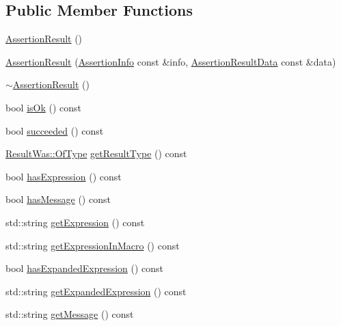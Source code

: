 \subsection*{Public Member Functions}
\begin{DoxyCompactItemize}
\item 
\hyperlink{class_catch_1_1_assertion_result_a570b999c5f66e33cb31d3adb29fec25b}{Assertion\-Result} ()
\item 
\hyperlink{class_catch_1_1_assertion_result_ab58aeec27052ba400633ed0e36cea692}{Assertion\-Result} (\hyperlink{struct_catch_1_1_assertion_info}{Assertion\-Info} const \&info, \hyperlink{struct_catch_1_1_assertion_result_data}{Assertion\-Result\-Data} const \&data)
\item 
\hyperlink{class_catch_1_1_assertion_result_abf90f5abd04d38b2fb4f5d575bdc4f1e}{$\sim$\-Assertion\-Result} ()
\item 
bool \hyperlink{class_catch_1_1_assertion_result_a70fb6aa62a38db3bdcafb4bb134afb21}{is\-Ok} () const 
\item 
bool \hyperlink{class_catch_1_1_assertion_result_a5404062147930354afeb154de7cbaa7e}{succeeded} () const 
\item 
\hyperlink{struct_catch_1_1_result_was_a624e1ee3661fcf6094ceef1f654601ef}{Result\-Was\-::\-Of\-Type} \hyperlink{class_catch_1_1_assertion_result_aa90bec8064879a62fcdc8e1079bcdba1}{get\-Result\-Type} () const 
\item 
bool \hyperlink{class_catch_1_1_assertion_result_a45551f4f092c640ffce0cdd8a94f4b62}{has\-Expression} () const 
\item 
bool \hyperlink{class_catch_1_1_assertion_result_ab22a1c9baa182aeb2549fffeb8294d9e}{has\-Message} () const 
\item 
std\-::string \hyperlink{class_catch_1_1_assertion_result_a6105300b90d66b5c11b69813f83d074d}{get\-Expression} () const 
\item 
std\-::string \hyperlink{class_catch_1_1_assertion_result_ac368a7490af7669decd58efea7d7dc54}{get\-Expression\-In\-Macro} () const 
\item 
bool \hyperlink{class_catch_1_1_assertion_result_a122c369bd49430a304e3eaebdf184f36}{has\-Expanded\-Expression} () const 
\item 
std\-::string \hyperlink{class_catch_1_1_assertion_result_a675d074588875eb62b0b6e36e05d65e6}{get\-Expanded\-Expression} () const 
\item 
std\-::string \hyperlink{class_catch_1_1_assertion_result_a9793bfc4d24678c8a013bda84a5aa905}{get\-Message} () const 

\end{DoxyCompactItemize}
